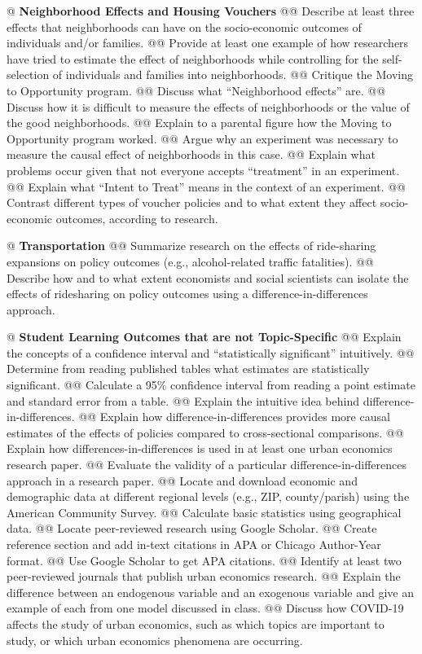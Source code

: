 \documentclass[11pt,letterpaper,final]{article}
\begin{document}
{@ \textbf{Neighborhood Effects and Housing Vouchers}
@@ Describe at least three effects that neighborhoods can have on the socio-economic outcomes of individuals and/or families.
@@ Provide at least one example of how researchers have tried to estimate the effect of neighborhoods while controlling for the self-selection of individuals and families into neighborhoods.
@@ Critique the Moving to Opportunity program.
@@ Discuss what ``Neighborhood effects'' are.
@@ Discuss how it is difficult to measure the effects of neighborhoods or the value of the good neighborhoods.
@@ Explain to a parental figure how the Moving to Opportunity program worked.
@@ Argue why an experiment was necessary to measure the causal effect of neighborhoods in this case.
@@ Explain what problems occur given that not everyone accepts ``treatment'' in an experiment.
@@ Explain what ``Intent to Treat'' means in the context of an experiment.
@@ Contrast different types of voucher policies and to what extent they affect socio-economic outcomes, according to research.

@ \textbf{Transportation}
@@ Summarize research on the effects of ride-sharing expansions on policy outcomes (e.g., alcohol-related traffic fatalities).
@@ Describe how and to what extent economists and social scientists can isolate the effects of ridesharing on policy outcomes using a difference-in-differences approach.

@ \textbf{Student Learning Outcomes that are not Topic-Specific}
@@ Explain the concepts of a confidence interval and ``statistically significant'' intuitively.
@@ Determine from reading published tables what estimates are statistically significant.
@@ Calculate a 95\% confidence interval from reading a point estimate and standard error from a table.
@@ Explain the intuitive idea behind difference-in-differences.
@@ Explain how difference-in-differences provides more causal estimates of the effects of policies compared to cross-sectional comparisons.
@@ Explain how differences-in-differences is used in at least one urban economics research paper.
@@ Evaluate the validity of a particular difference-in-differences approach in a research paper.
@@ Locate and download economic and demographic data at different regional levels (e.g., ZIP, county/parish) using the American Community Survey.
@@ Calculate basic statistics using geographical data.
@@ Locate peer-reviewed research using Google Scholar.
@@ Create reference section and add in-text citations in APA or Chicago Author-Year format.
@@ Use Google Scholar to get APA citations.
@@ Identify at least two peer-reviewed journals that publish urban economics research.
@@ Explain the difference between an endogenous variable and an exogenous variable and give an example of each from one model discussed in class.
@@ Discuss how COVID-19 affects the study of urban economics, such as which topics are important to study, or which urban economics phenomena are occurring.
}
\end{document}
